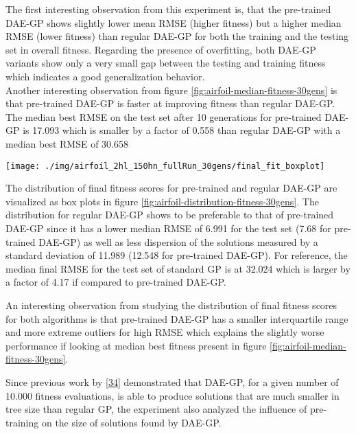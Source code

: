 \documentclass[
  11pt,
]{article}
\let\origfigure\figure
\let\endorigfigure\endfigure
\renewenvironment{figure}[1][2] {
    \expandafter\origfigure\expandafter[H]
} {
    \endorigfigure
}
\begin{document}
The first interesting observation from this experiment is, that the pre-trained DAE-GP shows slightly lower mean RMSE (higher fitness) but a higher median RMSE (lower fitness) than regular DAE-GP for both the training and the testing set in overall fitness.
Regarding the presence of overfitting, both DAE-GP variants show only a very small gap between the testing and training fitness which indicates a good generalization behavior.\\

Another interesting observation from figure \ref{fig:airfoil-median-fitness-30gens} is that pre-trained DAE-GP is faster at improving fitness than regular DAE-GP.
The median best RMSE on the test set after 10 generations for pre-trained DAE-GP is 17.093 which is smaller by a factor of 0.558 than regular DAE-GP with a median best RMSE of 30.658

\begin{figure}[c]

{\centering \texttt{[image: ./img/airfoil\_2hl\_150hn\_fullRun\_30gens/final\_fit\_boxplot]} 

}

\caption{Best Fitness after 30 Generations - Airfoil}\label{fig:airfoil-distribution-fitness-30gens}
\end{figure}

The distribution of final fitness scores for pre-trained and regular DAE-GP are visualized as box plots in figure \ref{fig:airfoil-distribution-fitness-30gens}.
The distribution for regular DAE-GP shows to be preferable to that of pre-trained DAE-GP since it has a lower median RMSE of 6.991 for the test set (7.68 for pre-trained DAE-GP) as well as less dispersion of the solutions measured by a standard deviation of 11.989 (12.548 for pre-trained DAE-GP).
For reference, the median final RMSE for the test set of standard GP is at 32.024 which is larger by a factor of 4.17 if compared to pre-trained DAE-GP.

An interesting observation from studying the distribution of final fitness scores for both algorithms is that pre-trained DAE-GP has a smaller interquartile range and more extreme outliers for high RMSE which explains the slightly worse performance if looking at median best fitness present in figure \ref{fig:airfoil-median-fitness-30gens}.

Since previous work by {[}\protect\hyperlink{ref-dae-gp_2022_symreg}{34}{]} demonstrated that DAE-GP, for a given number of 10.000 fitness evaluations, is able to produce solutions that are much smaller in tree size than regular GP, the experiment also analyzed the influence of pre-training on the size of solutions found by DAE-GP.
\end{document}
